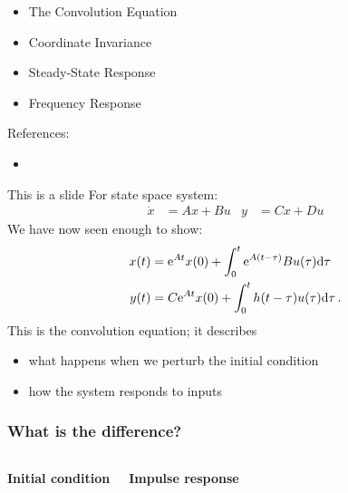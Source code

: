 \documentclass{beamer-control}
\begin{document}

\begin{SUMMARY}
\begin{itemize}
\item The Convolution Equation
\item Coordinate Invariance
\item Steady-State Response
\item Frequency Response
\end{itemize}
\vfill References:
\begin{itemize}
\item {}
\end{itemize}
\end{SUMMARY}




\begin{frame}{This is a slide}
For state space system:
\begin{align}
\dot x &= Ax + Bu & y &= Cx+Du
\end{align}
We have now seen enough to show:
\begin{align}
x(t) &= \mathrm{e}^{At}x(0) + \int^t_0 \mathrm{e}^{A(t-\tau)}Bu(\tau) \mathrm{d} \tau \\
y(t) &= C\mathrm{e}^{At}x(0) + \int_0^t h(t-\tau) u(\tau) \mathrm{d} \tau \,.
\end{align}
This is the \alert{convolution equation}; it describes
\begin{itemize}
\item what happens when we perturb the initial condition
\item how the system responds to inputs
\end{itemize}
\end{frame}

\begin{frame}
\frametitle{What is the difference?}
\begin{columns}
\centerline{\bfseries Initial condition}

\centerline{\bfseries Impulse response}

\end{columns}
\vspace*{0pt plus 1filll}
\end{frame}

\end{document}
